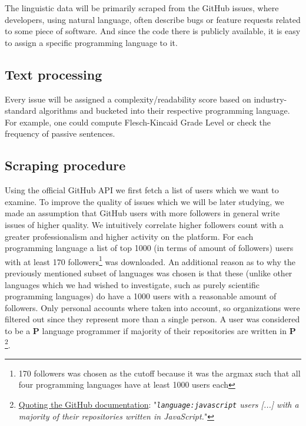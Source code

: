 \documentclass[]{article}
\newcommand{\code}[1]{\texttt{#1}}
\begin{document}
The linguistic data will be primarily scraped from the GitHub issues, where developers, using natural language, often describe bugs or feature requests related to some piece of software. And since the code there is publicly available, it is easy to assign a specific programming language to it.

\subsection{Text processing}

Every issue will be assigned a complexity/readability score based on industry-standard algorithms and bucketed into their respective programming language. For example, one could compute Flesch-Kincaid Grade Level or check the frequency of passive sentences.

\subsection{Scraping procedure} \label{scraping_procedure}

Using the official GitHub API we first fetch a list of users which we want to examine. To improve the quality of issues which we will be later studying, we made an assumption that GitHub users with more followers in general write issues of higher quality. We intuitively correlate higher followers count with a greater professionalism and higher activity on the platform. For each programming language a list of top 1000 (in terms of amount of followers) users with at least 170 followers\footnote{170 followers was chosen as the cutoff because it was the argmax such that all four programming languages have at least 1000 users each} was downloaded. An additional reason as to why the previously mentioned subset of languages was chosen is that these (unlike other languages which we had wished to investigate, such as purely scientific programming languages) do have a 1000 users with a reasonable amount of followers. Only personal accounts where taken into account, so organizations were filtered out since they represent more than a single person. A user was considered to be a $\mathbf P$ language programmer if majority of their repositories are written in $\mathbf P$\footnote{\href{https://docs.github.com/en/search-github/searching-on-github/searching-users\#search-by-repository-language}{Quoting the GitHub documentation}: "{\it \code{language:javascript} users [...] with a majority of their repositories written in JavaScript.}"}.
\end{document}
